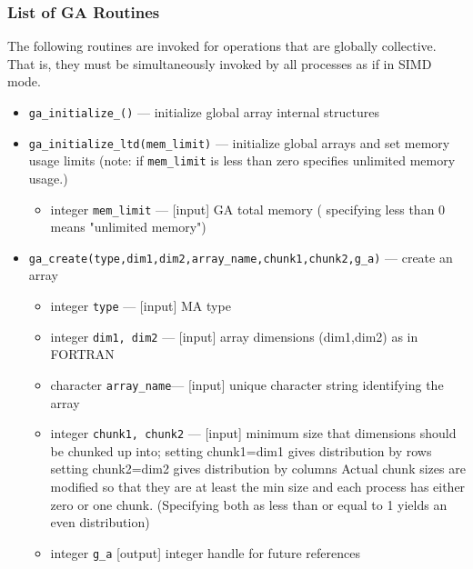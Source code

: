 \subsubsection{List of GA Routines}

The following routines are invoked for operations that are globally collective.
That is, they must be
simultaneously invoked by all processes as if in SIMD mode.

\begin{itemize}
\item {\tt ga\_initialize\_()} --- initialize global array internal
  structures
\item {\tt ga\_initialize\_ltd(mem\_limit)} --- initialize global arrays and set
  memory usage limits (note: if \verb+mem_limit+ is less than zero specifies
  unlimited memory usage.)
\begin{itemize}
\item      integer {\tt mem\_limit}       --- [input] GA total memory ( specifying less than 0
means "unlimited memory")
\end{itemize}

\item {\tt ga\_create(type,dim1,dim2,array\_name,chunk1,chunk2,g\_a)} --- create an array
\begin{itemize}
\item     integer {\tt type}         --- [input] MA type
\item     integer {\tt dim1, dim2}   --- [input] array dimensions (dim1,dim2) as in FORTRAN
\item     character {\tt array\_name}--- [input] unique character string identifying the array
\item     integer {\tt chunk1, chunk2} --- [input] minimum size that dimensions should
                                         be chunked up into;
                                         setting chunk1=dim1 gives distribution by rows
                                         setting chunk2=dim2 gives distribution by columns 
                                         Actual chunk sizes are modified so that they are
                                         at least the min size and each process has either
                                         zero or one chunk. 
                                         (Specifying both as less than or equal to 1 
                                         yields an even distribution)
\item     integer {\tt g\_a}             [output] integer handle for future references
\end{itemize}


\end{itemize}
